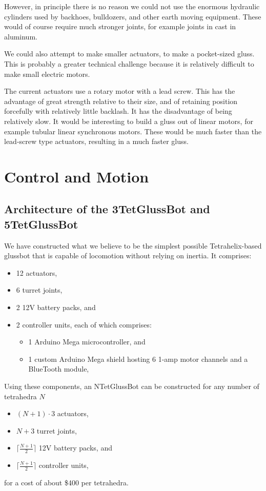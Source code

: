 \documentclass[11pt]{article}
\begin{document}
However, in principle there is no reason we could not use the enormous hydraulic cylinders
used by backhoes, bulldozers, and other earth moving equipment. These would of course require much
stronger joints, for example joints in cast in aluminum.

We could also attempt to make smaller actuators, to make a pocket-sized gluss. This is probably
a greater technical challenge because it is relatively difficult to make small electric motors.

The current actuators use a rotary motor with a lead screw. This has the advantage of great
strength relative to their size, and of retaining position forcefully with relatively little backlash. It has the disadvantage
of being relatively slow. It would be interesting to build a gluss out of linear motors, for
example tubular linear synchronous motors. These would be much faster than the lead-screw type
actuators, resulting in a much faster gluss. 

\section{Control and Motion}
\subsection{Architecture of the 3TetGlussBot and 5TetGlussBot}

We have constructed what we believe to be the simplest possible Tetrahelix-based glussbot that is capable of locomotion
without relying on inertia.
It comprises:
\begin{itemize}  
\item 12 actuators,
\item 6 turret joints,
\item 2 12V battery packs, and
\item 2 controller units, each of which comprises:
\begin{itemize}  
\item 1 Arduino Mega microcontroller, and
\item 1 custom Arduino Mega shield hosting 6 1-amp motor channels and a BlueTooth module,
\end{itemize}  
\end{itemize}

Using these components, an NTetGlussBot can be constructed for any number of tetrahedra $N$

\begin{itemize}  
\item $(N + 1)\cdot 3$  actuators,
\item $N+3$ turret joints,
\item $\lceil \frac{N + 1}{2} \rceil$ 12V battery packs, and
\item $\lceil \frac{N + 1}{2} \rceil$ controller units,
\end{itemize}
for a cost of about \$400 per tetrahedra.
\end{document}
